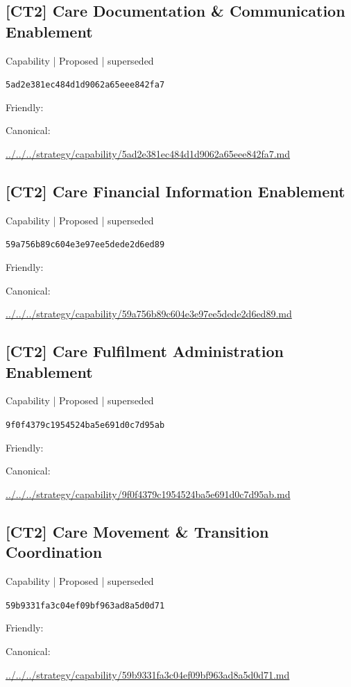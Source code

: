 \documentclass[10pt,a4paper]{article}
\begin{document}
\subsection*{[CT2] Care Documentation \& Communication Enablement}
{\small Capability | Proposed | superseded}\par
\texttt{5ad2e381ec484d1d9062a65eee842fa7}\par
Friendly: \par
Canonical: \par
{\footnotesize\url{../../../strategy/capability/5ad2e381ec484d1d9062a65eee842fa7.md}}\par
\subsection*{[CT2] Care Financial Information Enablement}
{\small Capability | Proposed | superseded}\par
\texttt{59a756b89c604e3e97ee5dede2d6ed89}\par
Friendly: \par
Canonical: \par
{\footnotesize\url{../../../strategy/capability/59a756b89c604e3e97ee5dede2d6ed89.md}}\par
\subsection*{[CT2] Care Fulfilment Administration Enablement}
{\small Capability | Proposed | superseded}\par
\texttt{9f0f4379c1954524ba5e691d0c7d95ab}\par
Friendly: \par
Canonical: \par
{\footnotesize\url{../../../strategy/capability/9f0f4379c1954524ba5e691d0c7d95ab.md}}\par
\subsection*{[CT2] Care Movement \& Transition Coordination}
{\small Capability | Proposed | superseded}\par
\texttt{59b9331fa3c04ef09bf963ad8a5d0d71}\par
Friendly: \par
Canonical: \par
{\footnotesize\url{../../../strategy/capability/59b9331fa3c04ef09bf963ad8a5d0d71.md}}\par
\end{document}
